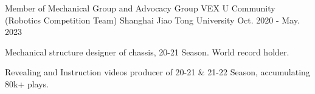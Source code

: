 

\begin{cventries}

    \cventry
    {Member of Mechanical Group and Advocacy Group} %
    {VEX U Community (Robotics Competition Team)} %
    {Shanghai Jiao Tong University} %
    {Oct. 2020 - May. 2023} %
    {
      \begin{cvitems} %
      \item Mechanical structure designer of chassis, 20-21 Season. World record holder. 
      \item Revealing and Instruction videos producer of 20-21 \& 21-22 Season, accumulating 80k+ plays.
      \end{cvitems}
    }
    
    

\end{cventries}
